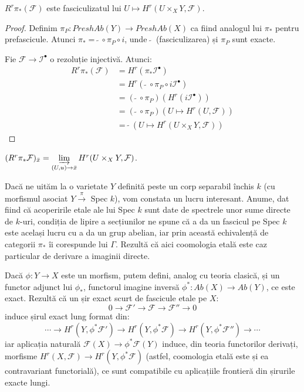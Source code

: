 \documentclass[13pt,openany]{book}
\begin{document}
\begin{prop}
$R^r\pi_*(\mathcal{F})$ este fasciculizatul lui $U \mapsto H^r(U \times_X Y, \mathcal{F})$.
\end{prop}

\begin{proof}
Definim $\pi_P: PreshAb(Y) \rightarrow PreshAb(X)$ ca fiind analogul lui $\pi_*$ pentru prefascicule. Atunci $\pi_* =\  \widetilde{}\ \circ \pi_P \circ i$, unde $\ \widetilde{}\ $ (fasciculizarea) și $\pi_P$ sunt exacte.

Fie $\mathcal{F} \rightarrow \mathcal{I}^\bullet$ o rezoluție injectivă. Atunci:
\begin{align*}
R^r\pi_*(\mathcal{F}) &= H^r(\pi_*\mathcal{I}^\bullet)\\
&= H^r (\ \widetilde{}\ \circ \pi_P \circ i\mathcal{I}^\bullet)\\
&= (\ \widetilde{}\ \circ \pi_P)(H^r(i\mathcal{I}^\bullet))\\
&=(\ \widetilde{}\ \circ \pi_P)(U \mapsto H^r(U, \mathcal{F}))\\
&=\ \widetilde{}\ (U \mapsto H^r(U \times_X Y, \mathcal{F}))
\end{align*}
\end{proof}

\begin{cor}
$(R^r\pi_*\mathcal{F})_{\bar{x}} = \varinjlim\limits_{(U,u) \rightarrow \bar{x}} H^r(U \times_X Y, \mathcal{F})$.
\end{cor}

Dacă ne uităm la o varietate $Y$ definită peste un corp separabil închis $k$ (cu morfismul asociat $Y \xrightarrow{\pi}$ Spec $k$), vom constata un lucru interesant. Anume, dat fiind că acoperirile etale ale lui Spec $k$ sunt date de spectrele unor sume directe de $k$-uri, condiția de lipire a secțiunilor ne spune că a da un fascicul pe Spec $k$ este același lucru cu a da un grup abelian, iar prin această echivalență de categorii $\pi_*$ îi corespunde lui $\Gamma$. Rezultă că aici coomologia etală este caz particular de derivare a imaginii directe.

Dacă $\phi:Y \rightarrow X$ este un morfism, putem defini, analog cu teoria clasică, și un functor adjunct lui $\phi_*$, functorul imagine inversă $\phi^* : Ab(X) \rightarrow Ab(Y)$, ce este exact. Rezultă că un șir exact scurt de fascicule etale pe $X$:
$$0 \rightarrow \mathcal{F}' \rightarrow \mathcal{F} \rightarrow \mathcal{F}'' \rightarrow 0$$
induce șirul exact lung format din:
$$\cdots \rightarrow H^r(Y,\phi^*\mathcal{F}') \rightarrow H^r(Y,\phi^*\mathcal{F}) \rightarrow H^r(Y,\phi^*\mathcal{F}'') \rightarrow \cdots$$
iar aplicația naturală $\mathcal{F}(X) \rightarrow \phi^*\mathcal{F}(Y)$ induce, din teoria functorilor derivați, morfisme $H^r(X,\mathcal{F}) \rightarrow H^r(Y,\phi^*\mathcal{F})$ (astfel, coomologia etală este și ea contravariant functorială), ce sunt compatibile cu aplicațiile frontieră din șirurile exacte lungi.
\end{document}
